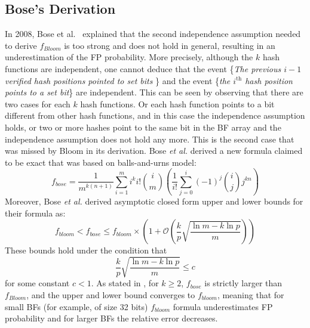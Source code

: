 \subsection{Bose's Derivation}
 In 2008, Bose et al.~\cite{bose2008false} explained that the second independence assumption needed to derive $f_{Bloom}$ is too strong and does not hold in general, resulting in an underestimation of the FP probability. More precisely, although the $k$ hash functions are independent, one cannot deduce that the event \{{\em The previous $i-1$ verified hash positions pointed to set bits} \} and the event \{{\em the $i^{\textrm{th}}$ hash position points to a set bit}\} are independent. This can be seen by observing that there are two cases for each $k$ hash functions. Or each hash function points to a bit different from other hash functions, and in this case the independence assumption holds, or two or more hashes point to the same bit in the BF array and the independence assumption does not hold any more. This is the second case that was missed by Bloom in its derivation. Bose \textit{et al.} derived a new formula claimed to be exact that was based on balls-and-urns model:
\begin{equation}
\label{fBose}
f_{bose}=\dfrac{1}{m^{k(n+1)}}  \sum\limits_{i=1}^{m}i^k i! \binom{i}{m}  \left(\dfrac{1}{i!} \sum\limits_{j=0}^{i} (-1)^j \binom{i}{j}j^{kn}\right)
\end{equation}
Moreover, Bose \textit{et al.} derived asymptotic closed form upper and lower bounds for their formula as:
\begin{equation}
\label{fBound}
f_{bloom} < f_{bose} \leqslant f_{bloom} \times \left(1 + \mathcal{O}\left(\frac{k}{p} \sqrt{\frac{\ln m - k\ln p}{m}}\right)\right)
\end{equation}
These bounds hold under the condition that
\begin{equation}
\label{boundCon}
\frac{k}{p} \sqrt{\frac{\ln m - k\ln p}{m}} \leqslant c
\end{equation}
for some constant $c < 1$. As stated in \cite{bose2008false}, for $k \geqslant  2$, $f_{bose}$ is strictly larger than $f_{Bloom}$, and the upper and lower bound converges to $f_{bloom}$, meaning that for small BFs (for example, of size 32 bits)  $f_{bloom}$ formula underestimates FP probability and for larger BFs the relative error decreases.
